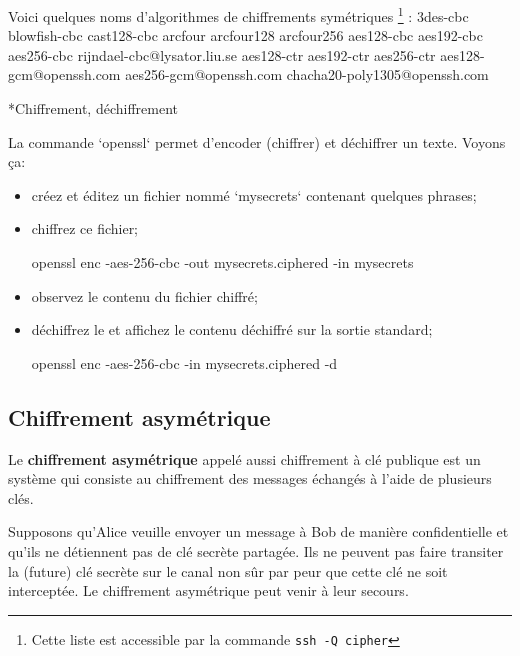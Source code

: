 \documentclass[a4paper,11pt]{article}
\begin{document}
Voici quelques noms d'algorithmes de chiffrements symétriques%
\footnote{Cette liste est accessible par la commande \texttt{ssh\ -Q\ cipher}}
: 3des-cbc blowfish-cbc cast128-cbc arcfour arcfour128 arcfour256 aes128-cbc
aes192-cbc aes256-cbc rijndael-cbc@lysator.liu.se aes128-ctr aes192-ctr
aes256-ctr aes128-gcm@openssh.com aes256-gcm@openssh.com
chacha20-poly1305@openssh.com


\begin{Exercice}*{Chiffrement, déchiffrement}
    
    La commande `openssl` permet d'encoder (chiffrer) et déchiffrer un texte.
    Voyons ça:
	
	\begin{itemize}
    	\item créez et éditez un fichier nommé `mysecrets` contenant quelques 
    		phrases;
    
    	\item chiffrez ce fichier;

			\begin{term}
		    openssl enc -aes-256-cbc -out mysecrets.ciphered -in mysecrets
			\end{term}

		\item observez le contenu du fichier chiffré;

		\item déchiffrez le et affichez le contenu déchiffré sur la sortie 
			standard;
			
			\begin{term}
		    openssl enc -aes-256-cbc -in mysecrets.ciphered -d
	        \end{term}
	
	\end{itemize}

\end{Exercice}




\subsection{Chiffrement asymétrique}
\label{chiffrement-asymétrique}

Le \textbf{chiffrement asymétrique} appelé aussi chiffrement à clé publique est
un système qui consiste au chiffrement des messages échangés à l'aide de
plusieurs clés. 

Supposons qu'Alice veuille envoyer un message à Bob de manière confidentielle et
qu'ils ne détiennent pas de clé secrète partagée. Ils ne peuvent pas faire
transiter la (future) clé secrète sur le canal non sûr par peur que cette clé ne
soit interceptée. Le chiffrement asymétrique peut venir à leur secours. 
\end{document}
